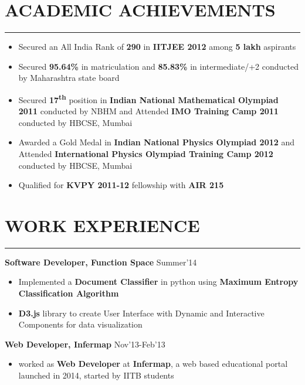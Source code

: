 \documentclass[11pt]{book} %
\begin{document}

\section*{ACADEMIC ACHIEVEMENTS}
\vspace{-2mm}
\hrule
\medskip
\begin{itemize}
\itemsep-0.3em
\item Secured an All India Rank of {\bf 290} in {\bf IITJEE 2012} among {\bf 5 lakh} aspirants
\item Secured {\bf 95.64\%} in matriculation and {\bf 85.83\%} in intermediate/+2 conducted by Maharashtra state board
\item Secured {\bf 17\textsuperscript{th}} position in {\bf Indian National Mathematical Olympiad 2011} conducted by NBHM and Attended 
{\bf IMO Training Camp 2011} conducted by HBCSE, Mumbai
\item Awarded a Gold Medal in {\bf Indian National Physics Olympiad 2012} and Attended {\bf International Physics 
Olympiad Training Camp 2012} conducted by HBCSE, Mumbai
\item Qualified for {\bf KVPY 2011-12} fellowship with {\bf AIR 215}
\end{itemize}
\vspace{-8mm}

\section*{WORK EXPERIENCE}
\vspace{-2mm}
\hrule
\medskip

\noindent \textbf{Software Developer, Function Space} \hfill Summer'14
\vspace{-3mm}
\begin{itemize}
\itemsep-0.3em
\item Implemented a \textbf{Document Classifier} in python using \textbf{Maximum Entropy Classification Algorithm}
\item \textbf{D3.js} library to create User Interface with Dynamic and Interactive Components for data visualization
\end{itemize}
\vspace{-1mm}

\noindent \textbf{Web Developer, Infermap} \hfill Nov'13-Feb'13
\vspace{-3mm}
\begin{itemize}
\itemsep-0.3em
\item worked as \textbf{Web Developer} at \textbf{Infermap}, a web based educational portal launched in 2014, started by IITB students
\end{itemize}
\vspace{-8mm}
\end{document}
